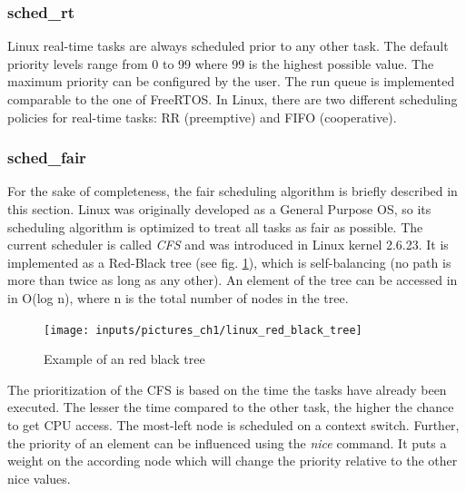 \subsubsection{sched\_rt} 
Linux real-time tasks are always scheduled prior to any other task. 
The default priority levels range from 0 to 99 where 99 is the highest possible value.
The maximum priority can be configured by the user. 
The run queue is implemented comparable to the one of FreeRTOS. 
In Linux, there are two different scheduling policies for real-time tasks: \ac{RR} (preemptive) and \ac{FIFO} (cooperative).

\subsubsection{sched\_fair}
For the sake of completeness, the fair scheduling algorithm is briefly described in this section.
Linux was originally developed as a General Purpose \ac{OS}, so its scheduling algorithm is optimized to treat all tasks as fair as possible. 
The current scheduler is called \textit{\ac{CFS}} and was introduced in Linux kernel 2.6.23.
It is implemented as a Red-Black tree (see fig. \ref{fig_linux_red_black_tree}), which is self-balancing (no path is more than twice as long as any other).
An element of the tree can be accessed in in O(log n), where n is the total number of nodes in the tree.

\begin{figure}[htb]
	\begin{center}
		\texttt{[image: inputs/pictures\_ch1/linux\_red\_black\_tree]}
	\end{center}
	\caption[Example of an red black tree]{Example of an red black tree \cite{jones:itlcfss}} \label{fig_linux_red_black_tree}
\end{figure}

The prioritization of the \ac{CFS} is based on the time the tasks have already been executed. 
The lesser the time compared to the other task, the higher the chance to get \ac{CPU} access.
The most-left node is scheduled on a context switch.
Further, the priority of an element can be influenced using the \textit{nice} command. 
It puts a weight on the according node which will change the priority relative to the other nice values.

